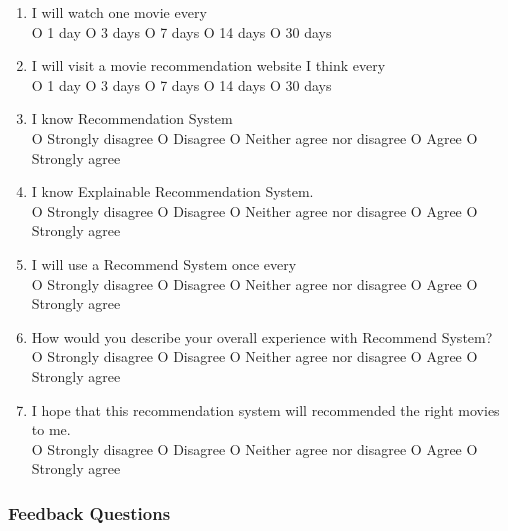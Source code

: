 \begin{enumerate}

\item  I will watch one movie every\\

O 1 day  O 3 days O 7 days O 14 days O 30 days

\item  I will visit a movie recommendation website I think every\\

O 1 day  O 3 days O 7 days O 14 days O 30 days

\item  I know Recommendation System\\

O Strongly disagree O Disagree O Neither agree nor disagree O Agree O Strongly agree

\item  I know Explainable Recommendation System.\\

O Strongly disagree O Disagree O Neither agree nor disagree O Agree O Strongly agree

\item  I will use a Recommend System once every\\

O Strongly disagree O Disagree O Neither agree nor disagree O Agree O Strongly agree

\item  How would you describe your overall experience with Recommend System?\\

O Strongly disagree O Disagree O Neither agree nor disagree O Agree O Strongly agree

\item  I hope that this recommendation system will recommended the right movies to me.\\

O Strongly disagree O Disagree O Neither agree nor disagree O Agree O Strongly agree

\end{enumerate}

\subsubsection{Feedback Questions}

